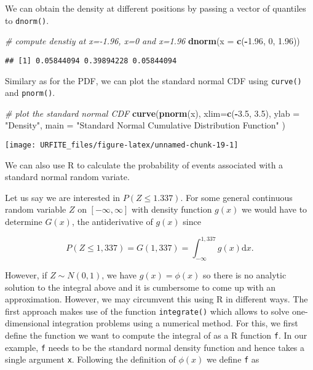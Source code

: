\documentclass[]{book}
\newenvironment{Shaded}{\begin{snugshade}}{\end{snugshade}}
\newcommand{\KeywordTok}[1]{\textcolor[rgb]{0.13,0.29,0.53}{\textbf{#1}}}
\newcommand{\DataTypeTok}[1]{\textcolor[rgb]{0.13,0.29,0.53}{#1}}
\newcommand{\DecValTok}[1]{\textcolor[rgb]{0.00,0.00,0.81}{#1}}
\newcommand{\FloatTok}[1]{\textcolor[rgb]{0.00,0.00,0.81}{#1}}
\newcommand{\StringTok}[1]{\textcolor[rgb]{0.31,0.60,0.02}{#1}}
\newcommand{\CommentTok}[1]{\textcolor[rgb]{0.56,0.35,0.01}{\textit{#1}}}
\newcommand{\OperatorTok}[1]{\textcolor[rgb]{0.81,0.36,0.00}{\textbf{#1}}}
\newcommand{\NormalTok}[1]{#1}
\theoremstyle{definition}
\theoremstyle{definition}
\theoremstyle{definition}
\theoremstyle{remark}
\begin{document}
We can obtain the density at different positions by passing a vector of
quantiles to \texttt{dnorm()}.

\begin{Shaded}
\begin{Highlighting}[]
\CommentTok{# compute denstiy at x=-1.96, x=0 and x=1.96}
\KeywordTok{dnorm}\NormalTok{(}\DataTypeTok{x =} \KeywordTok{c}\NormalTok{(}\OperatorTok{-}\FloatTok{1.96}\NormalTok{, }\DecValTok{0}\NormalTok{, }\FloatTok{1.96}\NormalTok{))}
\end{Highlighting}
\end{Shaded}

\begin{verbatim}
## [1] 0.05844094 0.39894228 0.05844094
\end{verbatim}

Similary as for the PDF, we can plot the standard normal CDF using
\texttt{curve()} and \texttt{pnorm()}.

\begin{Shaded}
\begin{Highlighting}[]
\CommentTok{# plot the standard normal CDF}
\KeywordTok{curve}\NormalTok{(}\KeywordTok{pnorm}\NormalTok{(x), }
      \DataTypeTok{xlim=}\KeywordTok{c}\NormalTok{(}\OperatorTok{-}\FloatTok{3.5}\NormalTok{, }\FloatTok{3.5}\NormalTok{), }
      \DataTypeTok{ylab =} \StringTok{"Density"}\NormalTok{, }
      \DataTypeTok{main =} \StringTok{"Standard Normal Cumulative Distribution Function"}
\NormalTok{      )}
\end{Highlighting}
\end{Shaded}

\begin{center}\texttt{[image: URFITE\_files/figure-latex/unnamed-chunk-19-1]} \end{center}

We can also use R to calculate the probability of events associated with
a standard normal random variate.

Let us say we are interested in \(P(Z \leq 1.337)\). For some general
continuous random variable \(Z\) on \([-\infty,\infty]\) with density
function \(g(x)\) we would have to determine \(G(x)\), the
antiderivative of \(g(x)\) since

\[ P(Z \leq 1,337 ) = G(1,337) = \int_{-\infty}^{1,337} g(x) \mathrm{d}x.  \]

However, if \(Z \sim N(0,1)\), we have \(g(x)=\phi(x)\) so there is no
analytic solution to the integral above and it is cumbersome to come up
with an approximation. However, we may circumvent this using R in
different ways. The first approach makes use of the function
\texttt{integrate()} which allows to solve one-dimensional integration
problems using a numerical method. For this, we first define the
function we want to compute the integral of as a R function \texttt{f}.
In our example, \texttt{f} needs to be the standard normal density
function and hence takes a single argument \texttt{x}. Following the
definition of \(\phi(x)\) we define \texttt{f} as
\end{document}
